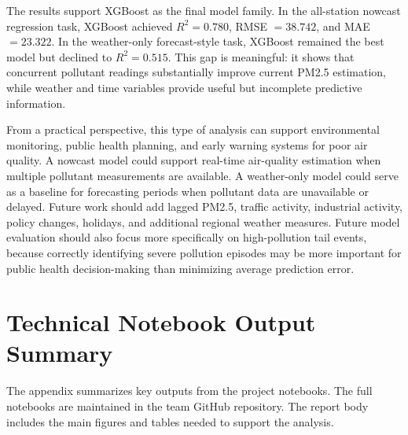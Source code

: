 \documentclass[stu,12pt,floatsintext]{apa7}
\begin{document}
The results support XGBoost as the final model family. In the all-station
nowcast regression task, XGBoost achieved $R^{2} = 0.780$, RMSE $= 38.742$, and
MAE $= 23.322$. In the weather-only forecast-style task, XGBoost remained the best model
but declined to $R^{2} = 0.515$. This gap is meaningful: it shows that concurrent
pollutant readings substantially improve current PM2.5 estimation, while weather and time
variables provide useful but incomplete predictive information.

From a practical perspective, this type of analysis can support environmental monitoring,
public health planning, and early warning systems for poor air quality. A nowcast model
could support real-time air-quality estimation when multiple pollutant measurements are
available. A weather-only model could serve as a baseline for forecasting periods when
pollutant data are unavailable or delayed. Future work should add lagged PM2.5, traffic
activity, industrial activity, policy changes, holidays, and additional regional weather
measures. Future model evaluation should also focus more specifically on high-pollution
tail events, because correctly identifying severe pollution episodes may be more important
for public health decision-making than minimizing average prediction error.

\nocite{*}
\printbibliography

\appendix

\section{Technical Notebook Output Summary}

The appendix summarizes key outputs from the project notebooks. The full notebooks are
maintained in the team GitHub repository. The report body includes the main figures and
tables needed to support the analysis.
\end{document}
